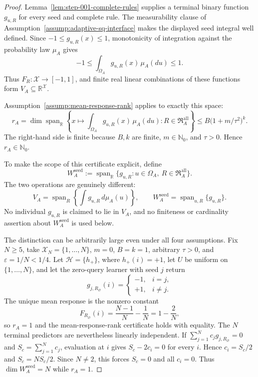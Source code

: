 \begin{proof}
Lemma~\ref{lem:step-001-complete-rules} supplies a terminal binary function
\(g_{u,R}\) for every seed and complete rule.  The measurability clause of
Assumption~\ref{assump:adaptive-sq-interface} makes the displayed seed
integral well defined.  Since \(-1\le g_{u,R}(x)\le1\), monotonicity of
integration against the probability law \(\mu_A\) gives
\[
-1\le\int_{\Omega_A}g_{u,R}(x)\,\mu_A(du)\le1.
\]
Thus \(F_R:\mathcal X\to[-1,1]\), and finite real linear combinations of
these functions form \(V_A\subseteq\mathbb R^{\mathcal X}\).

Assumption~\ref{assump:mean-response-rank} applies to exactly this space:
\[
r_A=\dim\operatorname{span}_{\mathbb R}
\left\{x\mapsto\int_{\Omega_A}g_{u,R}(x)\,\mu_A(du):
R\in\mathfrak R_A^{\mathrm{all}}\right\}
\le B\bigl(1+m/\tau^2\bigr)^k.
\]
The right-hand side is finite because \(B,k\) are finite,
\(m\in\mathbb N_0\), and \(\tau>0\).  Hence \(r_A\in\mathbb N_0\).

To make the scope of this certificate explicit, define
\[
W_A^{\mathrm{seed}}
:=\operatorname{span}_{\mathbb R}
\{g_{u,R}:u\in\Omega_A,\ R\in\mathfrak R_A^{\mathrm{all}}\}.
\]
The two operations are genuinely different:
\[
V_A=\operatorname{span}_{R}
\left\{\int g_{u,R}\,d\mu_A(u)\right\},
\qquad
W_A^{\mathrm{seed}}=\operatorname{span}_{u,R}\{g_{u,R}\}.
\]
No individual \(g_{u,R}\) is claimed to lie in \(V_A\), and no finiteness
or cardinality assertion about \(W_A^{\mathrm{seed}}\) is used below.

The distinction can be arbitrarily large even under all four assumptions.
Fix \(N\ge5\), take \(\mathcal X_N=\{1,\ldots,N\}\), \(m=0\),
\(B=k=1\), arbitrary \(\tau>0\), and \(\varepsilon=1/N<1/4\).  Let
\(\mathcal H=\{h_+\}\), where \(h_+(i)=+1\), let \(U\) be uniform on
\(\{1,\ldots,N\}\), and let the zero-query learner with seed \(j\) return
\[
g_{j,R_\varnothing}(i)=
\begin{cases}
-1,&i=j,\\
+1,&i\ne j.
\end{cases}
\]
The unique mean response is the nonzero constant
\[
F_{R_\varnothing}(i)=\frac{N-1}{N}-\frac1N=1-\frac2N,
\]
so \(r_A=1\) and the mean-response-rank certificate holds with equality.
The \(N\) terminal predictors are nevertheless linearly independent.  If
\(\sum_{j=1}^N c_jg_{j,R_\varnothing}=0\) and
\(S_c=\sum_{j=1}^Nc_j\), evaluation at \(i\) gives
\(S_c-2c_i=0\) for every \(i\).  Hence \(c_i=S_c/2\) and
\(S_c=NS_c/2\).  Since \(N\ne2\), this forces \(S_c=0\) and all
\(c_i=0\).  Thus \(\dim W_A^{\mathrm{seed}}=N\) while \(r_A=1\).


\end{proof}
